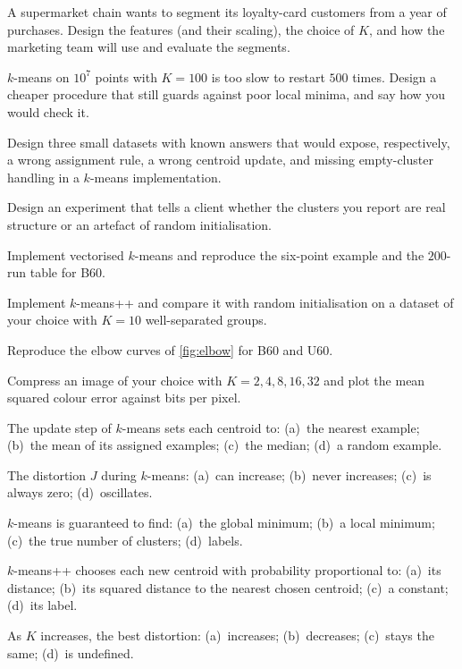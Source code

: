 
\dpr A supermarket chain wants to segment its loyalty-card customers from a year
of purchases. Design the features (and their scaling), the choice of $K$, and how
the marketing team will use and evaluate the segments.

\dpr $k$-means on $10^7$ points with $K = 100$ is too slow to restart $500$
times. Design a cheaper procedure that still guards against poor local minima,
and say how you would check it.

\dpr Design three small datasets with known answers that would expose,
respectively, a wrong assignment rule, a wrong centroid update, and missing
empty-cluster handling in a $k$-means implementation.

\dpr Design an experiment that tells a client whether the clusters you report are
real structure or an artefact of random initialisation.


\pe Implement vectorised $k$-means and reproduce the six-point example and the
$200$-run table for B60.

\pe Implement $k$-means++ and compare it with random initialisation on a dataset
of your choice with $K = 10$ well-separated groups.

\pe Reproduce the elbow curves of \cref{fig:elbow} for B60 and U60.

\pe Compress an image of your choice with $K = 2, 4, 8, 16, 32$ and plot the mean
squared colour error against bits per pixel.


\qz The update step of $k$-means sets each centroid to: (a)~the nearest example;
(b)~the mean of its assigned examples; (c)~the median; (d)~a random example.

\qz The distortion $J$ during $k$-means: (a)~can increase; (b)~never increases;
(c)~is always zero; (d)~oscillates.

\qz $k$-means is guaranteed to find: (a)~the global minimum; (b)~a local minimum;
(c)~the true number of clusters; (d)~labels.

\qz $k$-means++ chooses each new centroid with probability proportional to:
(a)~its distance; (b)~its squared distance to the nearest chosen centroid;
(c)~a constant; (d)~its label.

\qz As $K$ increases, the best distortion: (a)~increases; (b)~decreases;
(c)~stays the same; (d)~is undefined.

